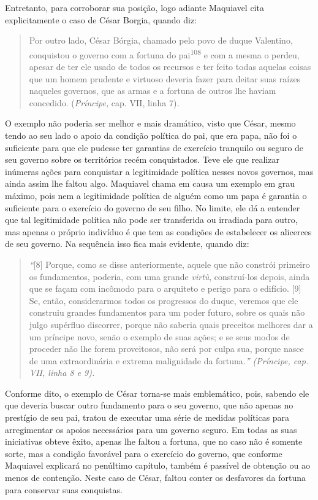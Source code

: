 Entretanto, para corroborar sua posição, logo adiante Maquiavel cita
explicitamente o caso de César Borgia, quando diz:

\begin{quote}
Por outro lado, César Bórgia, chamado pelo povo de duque Valentino,
conquistou o governo com a fortuna do pai\textsuperscript{108} e com a
mesma o perdeu, apesar de ter ele usado de todos os recursos e ter feito
todas aquelas coisas que um homem prudente e virtuoso deveria fazer para
deitar suas raízes naqueles governos, que as armas e a fortuna de outros
lhe haviam concedido. (\emph{Príncipe,} cap. VII, linha 7)\emph{.}
\end{quote}

O exemplo não poderia ser melhor e mais dramático, visto que César,
mesmo tendo ao seu lado o apoio da condição política do pai, que era
papa, não foi o suficiente para que ele pudesse ter garantias de
exercício tranquilo ou seguro de seu governo sobre os territórios recém
conquistados. Teve ele que realizar inúmeras ações para conquistar a
legitimidade política nesses novos governos, mas ainda assim lhe faltou
algo. Maquiavel chama em causa um exemplo em grau máximo, pois nem a
legitimidade política de alguém como um papa é garantia o suficiente
para o exercício do governo de seu filho. No limite, ele dá a entender
que tal legitimidade política não pode ser transferida ou irradiada para
outro, mas apenas o próprio indivíduo é que tem as condições de
estabelecer os alicerces de seu governo. Na sequência isso fica mais
evidente, quando diz:

\begin{quote}
\emph{``}{[}8{]} Porque, como se disse anteriormente, aquele que não
constrói primeiro os fundamentos, poderia, com uma grande \emph{virtù},
construí-los depois, ainda que se façam com incômodo para o arquiteto e
perigo para o edifício. {[}9{]} Se, então, considerarmos todos os
progressos do duque, veremos que ele construiu grandes fundamentos para
um poder futuro, sobre os quais não julgo supérfluo discorrer, porque
não saberia quais preceitos melhores dar a um príncipe novo, senão o
exemplo de suas ações; e se seus modos de proceder não lhe forem
proveitosos, não será por culpa sua, porque nasce de uma extraordinária
e extrema malignidade da fortuna.\emph{'' (Príncipe, cap. VII, linha 8 e
9).}
\end{quote}

Conforme dito, o exemplo de César torna-se mais emblemático, pois,
sabendo ele que deveria buscar outro fundamento para o seu governo, que
não apenas no prestígio de seu pai, tratou de executar uma série de
medidas políticas para arregimentar os apoios necessários para um
governo seguro. Em todas as suas iniciativas obteve êxito, apenas lhe
faltou a fortuna, que no caso não é somente sorte, mas a condição
favorável para o exercício do governo, que conforme Maquiavel explicará
no penúltimo capítulo, também é passível de obtenção ou ao menos de
contenção. Neste caso de César, faltou conter os desfavores da fortuna
para conservar suas conquistas.

